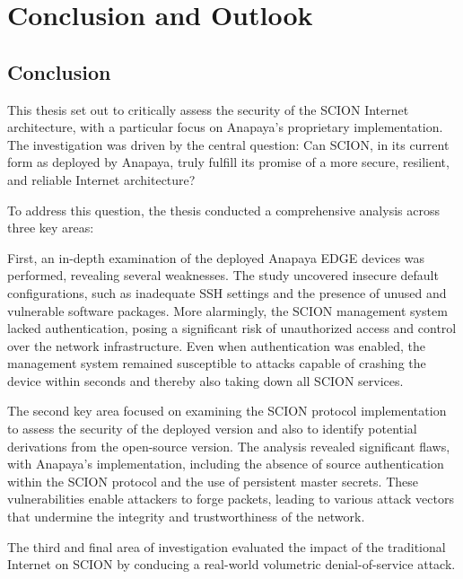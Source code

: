 \chapter{Conclusion and Outlook}
\label{ch:conclusion}



\section{Conclusion}

This thesis set out to critically assess the security of the SCION Internet architecture, with a particular focus on Anapaya's proprietary implementation.
The investigation was driven by the central question:
Can SCION, in its current form as deployed by Anapaya, truly fulfill its promise of a more secure, resilient, and reliable Internet architecture?

To address this question, the thesis conducted a comprehensive analysis across three key areas:

First, an in-depth examination of the deployed Anapaya EDGE devices was performed, revealing several weaknesses.
The study uncovered insecure default configurations, such as inadequate SSH settings and the presence of unused and vulnerable software packages.
More alarmingly, the SCION management system lacked authentication, posing a significant risk of unauthorized access and control over the network infrastructure.
Even when authentication was enabled, the management system remained susceptible to attacks capable of crashing the device within seconds and thereby also taking down all SCION services.


The second key area focused on examining the SCION protocol implementation to assess the security of the deployed version and also to identify potential derivations from the open-source version.
The analysis revealed significant flaws, with Anapaya's implementation, including the absence of source authentication within the SCION protocol and the use of persistent master secrets.
These vulnerabilities enable attackers to forge packets, leading to various attack vectors that undermine the integrity and trustworthiness of the network.


The third and final area of investigation evaluated the impact of the traditional Internet on SCION by conducing a real-world volumetric denial-of-service attack.


